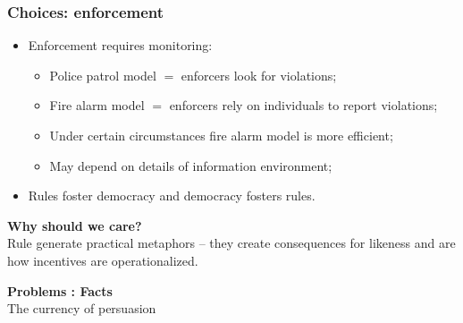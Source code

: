 \documentclass[aspectratio=169]{beamer}
\theoremstyle{principle}
\begin{document}
\begin{frame}
\frametitle{Choices: enforcement}

\begin{itemize}
\item Enforcement requires monitoring:
\begin{itemize}
\item Police patrol model $=$ enforcers look for violations;
\item Fire alarm model $=$ enforcers rely on individuals to report violations;
\item Under certain circumstances fire alarm model is more efficient;
\item May depend on details of information environment;
\end{itemize}
\bigskip
\bigskip
\item Rules foster democracy and democracy fosters rules.
\end{itemize}

\end{frame}

\begin{frame}

\begin{center}
\Huge\textbf{Why should we care?}\\
\bigskip
\bigskip
\large Rule generate practical metaphors -- they create consequences for likeness and are how incentives are operationalized.
\\
\end{center}

\end{frame}

\begin{frame}

\begin{center}
\Huge\textbf{Problems : Facts}\\
\bigskip
\bigskip
\large The currency of persuasion
\end{center}

\end{frame}
\end{document}
